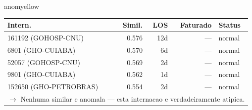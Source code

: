 \documentclass[a4paper,10pt]{article}
\begin{document}
\begin{anomalycard}[Internacao 91285 | GHO-BRADESCO | MODERADO (z=2.28)]{anomyellow}
\begin{tabular}{l r r r l}\toprule\textbf{Intern.} & \textbf{Simil.} & \textbf{LOS} & \textbf{Faturado} & \textbf{Status} \\\midrule
161192 (GOHOSP-CNU) & 0.576 & 12d & --- & \textcolor{jcubeblue}{normal} \\
6801 (GHO-CUIABA) & 0.570 & 6d & --- & \textcolor{jcubeblue}{normal} \\
52057 (GOHOSP-CNU) & 0.569 & 2d & --- & \textcolor{jcubeblue}{normal} \\
9801 (GHO-CUIABA) & 0.562 & 1d & --- & \textcolor{jcubeblue}{normal} \\
152650 (GHO-PETROBRAS) & 0.554 & 2d & --- & \textcolor{jcubeblue}{normal} \\
\multicolumn{5}{l}{\textcolor{jcubeblue}{\small $\rightarrow$ Nenhuma similar e anomala --- esta internacao e verdadeiramente atipica.}} \\
\bottomrule\end{tabular}



\end{anomalycard}

\newpage
\end{document}
